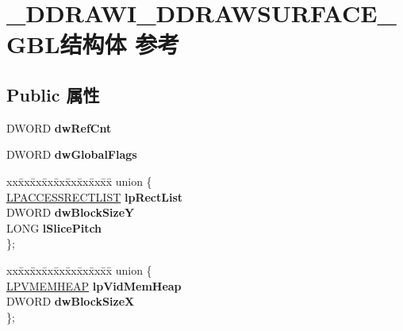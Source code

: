 \hypertarget{struct___d_d_r_a_w_i___d_d_r_a_w_s_u_r_f_a_c_e___g_b_l}{}\section{\+\_\+\+D\+D\+R\+A\+W\+I\+\_\+\+D\+D\+R\+A\+W\+S\+U\+R\+F\+A\+C\+E\+\_\+\+G\+B\+L结构体 参考}
\label{struct___d_d_r_a_w_i___d_d_r_a_w_s_u_r_f_a_c_e___g_b_l}
\subsection*{Public 属性}
\begin{DoxyCompactItemize}
\item 
\mbox{\label{struct___d_d_r_a_w_i___d_d_r_a_w_s_u_r_f_a_c_e___g_b_l_ad390628486d2151192d0cb32c09db29a}} 
D\+W\+O\+RD {\bfseries dw\+Ref\+Cnt}
\item 
\mbox{\label{struct___d_d_r_a_w_i___d_d_r_a_w_s_u_r_f_a_c_e___g_b_l_a3aaaa27fb6b62bf4f994bde21fddd923}} 
D\+W\+O\+RD {\bfseries dw\+Global\+Flags}
\item 
\mbox{\label{struct___d_d_r_a_w_i___d_d_r_a_w_s_u_r_f_a_c_e___g_b_l_a7fe6cb9135b543e2a81a2279eee3dddf}} 
\begin{tabbing}
xx\=xx\=xx\=xx\=xx\=xx\=xx\=xx\=xx\=\kill
union \{\\
\>\hyperlink{struct___a_c_c_e_s_s_r_e_c_t_l_i_s_t}{LPACCESSRECTLIST} {\bfseries lpRectList}\\
\>DWORD {\bfseries dwBlockSizeY}\\
\>LONG {\bfseries lSlicePitch}\\
\}; \\

\end{tabbing}\item 
\mbox{\label{struct___d_d_r_a_w_i___d_d_r_a_w_s_u_r_f_a_c_e___g_b_l_a900c3a3248986a2e81eff9e54cd837b4}} 
\begin{tabbing}
xx\=xx\=xx\=xx\=xx\=xx\=xx\=xx\=xx\=\kill
union \{\\
\>\hyperlink{struct___v_m_e_m_h_e_a_p}{LPVMEMHEAP} {\bfseries lpVidMemHeap}\\
\>DWORD {\bfseries dwBlockSizeX}\\
\}; \\


\end{tabbing}
\end{DoxyCompactItemize}
